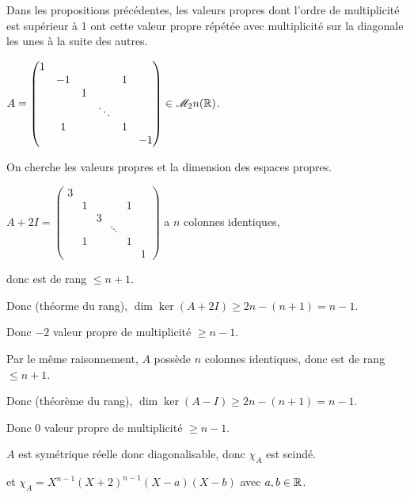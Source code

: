 \begin{remarque}
    Dans les propositions précédentes, les valeurs propres dont l'ordre de multiplicité est 
    supérieur à 1 ont cette valeur propre répétée avec multiplicité sur la 
    diagonale les unes à la suite des autres.
\end{remarque}


\begin{exemple}
    $A = \begin{pmatrix}
        1 & & & & & \\
        & -1 & & & 1 & \\
        & & 1 & & & \\
        & & & \ddots & & \\
        & 1 & & & 1 & \\
        & & & & & -1
        \end{pmatrix} \in \mathscr M_2n(\mathbb{R})$.

        On cherche les valeurs propres et la dimension des espaces propres. 

        $A + 2I = \begin{pmatrix}
            3 & & & & & \\
            & 1 & & & 1 & \\
            & & 3 & & & \\
            & & & \ddots & & \\
            & 1 & & & 1 & \\
            & & & & & 1
        \end{pmatrix}$ a $n$ colonnes identiques, 
        
        donc est de rang $\leqslant n + 1$.

        Donc (théorme du rang), $\dim \ker(A + 2I) \geqslant 2n - (n + 1) = n - 1$.

        Donc $-2$ valeur propre de multiplicité $\geqslant n - 1$.

        Par le même raisonnement, $A$ possède $n$ colonnes identiques, donc est 
        de rang $\leqslant n + 1$.

        Donc (théorème du rang), $\dim \ker(A - I) \geqslant 2n - (n + 1) = n - 1$.

        Donc $0$ valeur propre de multiplicité $\geqslant n - 1$.

        $A$ est symétrique réelle donc diagonalisable, donc $\chi_A$ est scindé. 

        et $\chi_A = X^{n -1} (X + 2)^{n - 1} (X - a)(X - b)$ avec $a, b \in \mathbb{R}$.


\end{exemple}

